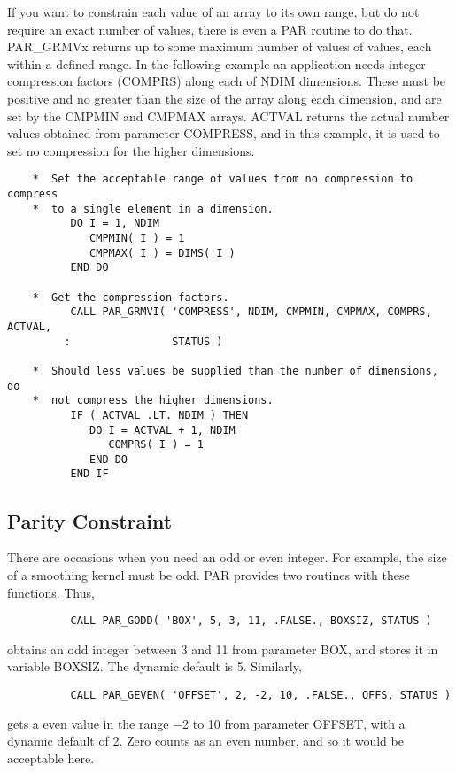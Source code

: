 \documentclass[twoside,11pt]{article}
\newcommand{\xlabel}[1]{}
\begin{document}
If you want to constrain each value of an array to its own range, but do
not require an exact number of values, there is even a PAR routine to do
that.  PAR\_GRMVx returns up to some maximum number of values of values,
each within a defined range.  In the following example an application
needs integer compression factors (COMPRS) along each of NDIM
dimensions.  These must be positive and no greater than the size of the
array along each dimension, and are set by the CMPMIN and CMPMAX arrays.
ACTVAL returns the actual number values obtained from parameter
COMPRESS, and in this example, it is used to set no compression for the
higher dimensions. 

\begin{verbatim}
    *  Set the acceptable range of values from no compression to compress
    *  to a single element in a dimension.
          DO I = 1, NDIM
             CMPMIN( I ) = 1
             CMPMAX( I ) = DIMS( I )
          END DO

    *  Get the compression factors.
          CALL PAR_GRMVI( 'COMPRESS', NDIM, CMPMIN, CMPMAX, COMPRS, ACTVAL,
         :                STATUS )

    *  Should less values be supplied than the number of dimensions, do
    *  not compress the higher dimensions.
          IF ( ACTVAL .LT. NDIM ) THEN
             DO I = ACTVAL + 1, NDIM
                COMPRS( I ) = 1
             END DO
          END IF
\end{verbatim}

\subsection{\xlabel{parity_constraint}Parity Constraint}

There are occasions when you need an odd or even integer.  For example,
the size of a smoothing kernel must be odd.  PAR provides two routines
with these functions.  Thus,

\begin{verbatim}
          CALL PAR_GODD( 'BOX', 5, 3, 11, .FALSE., BOXSIZ, STATUS )
\end{verbatim}

obtains an odd integer between 3 and 11 from parameter BOX, and stores
it in variable BOXSIZ.  The dynamic default is 5.  Similarly,

\begin{verbatim}
          CALL PAR_GEVEN( 'OFFSET', 2, -2, 10, .FALSE., OFFS, STATUS )
\end{verbatim}
gets a even value in the range $-$2 to 10 from parameter OFFSET, with a
dynamic default of 2.  Zero counts as an even number, and so it would be
acceptable here.
\end{document}

